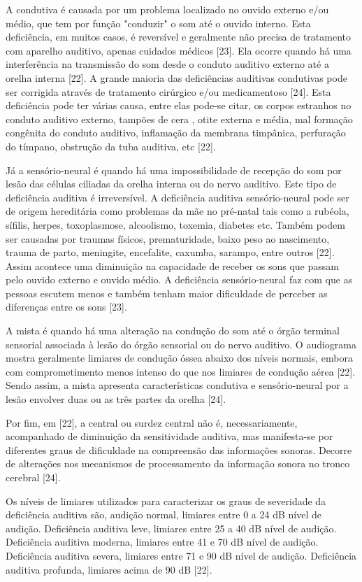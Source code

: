 \documentclass[a4paper]{article}
\begin{document}
\begin{titlepage}
A condutiva é causada por um problema localizado no ouvido externo e/ou médio, que tem por função "conduzir" o som até o ouvido interno. Esta deficiência, em muitos casos, é reversível e geralmente não precisa de tratamento com aparelho auditivo, apenas cuidados médicos [23]. Ela ocorre quando há uma interferência na transmissão do som desde o conduto auditivo externo até a orelha interna [22]. A grande maioria das deficiências auditivas condutivas pode ser corrigida através de tratamento cirúrgico e/ou medicamentoso [24]. Esta deficiência pode ter várias causa, entre elas pode-se citar, os corpos estranhos no conduto auditivo externo, tampões de cera , otite externa e média, mal formação congênita do conduto auditivo, inflamação da membrana timpânica, perfuração do tímpano, obstrução da tuba auditiva, etc [22].

Já a sensório-neural é quando há uma impossibilidade de recepção do som por lesão das células ciliadas da orelha interna ou do nervo auditivo. Este tipo de deficiência auditiva é irreversível. A deficiência auditiva sensório-neural pode ser de origem hereditária como problemas da mãe no pré-natal tais como a rubéola, sífilis, herpes, toxoplasmose, alcoolismo, toxemia, diabetes etc. Também podem ser causadas por traumas físicos, prematuridade, baixo peso ao nascimento, trauma de parto, meningite, encefalite, caxumba, sarampo, entre outros [22]. Assim acontece uma diminuição na capacidade de receber os sons que passam pelo ouvido externo e ouvido médio. A deficiência sensório-neural faz com que as pessoas escutem menos e também tenham maior dificuldade de perceber as diferenças entre os sons [23].

A mista é quando há uma alteração na condução do som até o órgão terminal sensorial associada à lesão do órgão sensorial ou do nervo auditivo. O audiograma mostra geralmente limiares de condução óssea abaixo dos níveis normais, embora com comprometimento menos intenso do que nos limiares de condução aérea [22]. Sendo assim, a mista apresenta características condutiva e sensório-neural por a lesão envolver duas ou as três partes da orelha [24].

Por fim, em [22], a central ou surdez central não é, necessariamente, acompanhado de diminuição da sensitividade auditiva, mas manifesta-se por diferentes graus de dificuldade na compreensão das informações sonoras. Decorre de alterações nos mecanismos de processamento da informação sonora no tronco cerebral [24].

Os níveis de limiares utilizados para caracterizar os graus de severidade da deficiência auditiva são, audição normal, limiares entre 0 a 24 dB nível de audição. Deficiência auditiva leve, limiares entre 25 a 40 dB nível de audição. Deficiência auditiva moderna, limiares entre 41 e 70 dB nível de audição. Deficiência auditiva severa, limiares entre 71 e 90 dB nível de audição. Deficiência auditiva profunda, limiares acima de 90 dB [22].


\end{titlepage}
\end{document}
